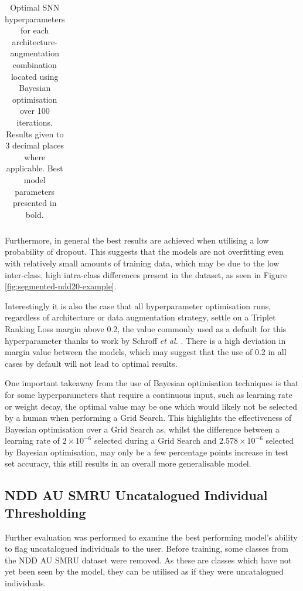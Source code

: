 \begin{table}[!t]
{\begin{tabular}{ccccccccccccc}
			\bottomrule                                                      
	\end{tabular}}
	\caption[Optimal SNN hyperparameters for each architecture-augmentation combination located using Bayesian optimisation over 100 iterations.]{Optimal SNN hyperparameters for each architecture-augmentation combination located using Bayesian optimisation over 100 iterations. Results given to 3 decimal places where applicable. Best model parameters presented in bold.}
	\label{tab:optunaBestParamsPerSNN}
\end{table}

 Furthermore, in general the best results are achieved when utilising a low probability of dropout. This suggests that the models are not overfitting even with relatively small amounts of training data, which may be due to the low inter-class, high intra-class differences present in the dataset, as seen in Figure \ref{fig:segmented-ndd20-example}.
 
 Interestingly it is also the case that all hyperparameter optimisation runs, regardless of architecture or data augmentation strategy, settle on a Triplet Ranking Loss margin above 0.2, the value commonly used as a default for this hyperparameter thanks to work by Schroff \textit{et al.} \cite{schroff_facenet_2015}. There is a high deviation in margin value between the models, which may suggest that the use of 0.2 in all cases by default will not lead to optimal results.
 
 One important takeaway from the use of Bayesian optimisation techniques is that for some hyperparameters that require a continuous input, such as learning rate or weight decay, the optimal value may be one which would likely not be selected by a human when performing a Grid Search. This highlights the effectiveness of Bayesian optimisation over a Grid Search as, whilst the difference between a learning rate of $2\times10^{-6}$ selected during a Grid Search and $2.578\times10^{-6}$ selected by Bayesian optimisation, may only be a few percentage points increase in test set accuracy, this still results in an overall more generalisable model. 
 
\subsection{ NDD AU SMRU Uncatalogued Individual Thresholding}\label{ch:ID,sec:ModelSelection,subsec:UncataloguedIndividualThresholding}

Further evaluation was performed to examine the best performing model's ability to flag uncatalogued individuals to the user. Before training, some classes from the NDD AU SMRU dataset were removed. As these are classes which have not yet been seen by the model, they can be utilised as if they were uncatalogued individuals.

